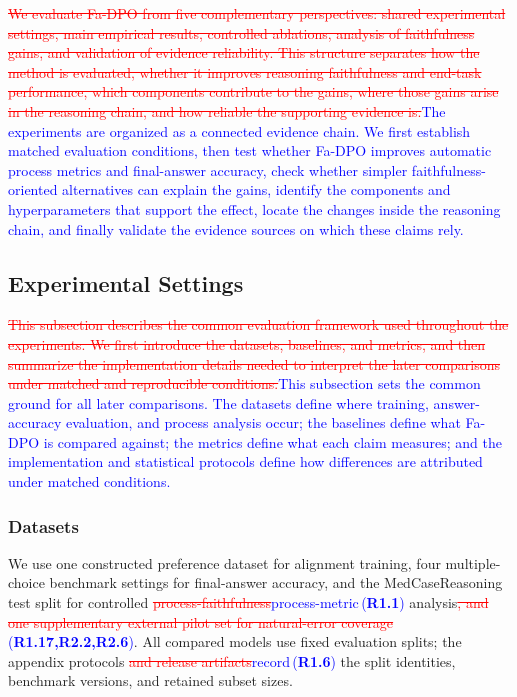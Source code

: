 \documentclass[a4paper,fleqn,doubleblind]{cas-sc}
\DeclareRobustCommand{\deleted}[1]{\textcolor{red}{\sout{#1}}}
\DeclareRobustCommand{\added}[1]{\textcolor{blue}{#1}}
\DeclareRobustCommand{\revtag}[1]{\textcolor{blue}{\scriptsize\,(\textbf{#1})}}
\begin{document}
\deleted{We evaluate Fa-DPO from five complementary perspectives: shared experimental settings, main empirical results, controlled ablations, analysis of faithfulness gains, and validation of evidence reliability. This structure separates how the method is evaluated, whether it improves reasoning faithfulness and end-task performance, which components contribute to the gains, where those gains arise in the reasoning chain, and how reliable the supporting evidence is.}\added{The experiments are organized as a connected evidence chain. We first establish matched evaluation conditions, then test whether Fa-DPO improves automatic process metrics and final-answer accuracy, check whether simpler faithfulness-oriented alternatives can explain the gains, identify the components and hyperparameters that support the effect, locate the changes inside the reasoning chain, and finally validate the evidence sources on which these claims rely.}

\subsection{Experimental Settings}
\label{subsec:settings}

\deleted{This subsection describes the common evaluation framework used throughout the experiments. We first introduce the datasets, baselines, and metrics, and then summarize the implementation details needed to interpret the later comparisons under matched and reproducible conditions.}\added{This subsection sets the common ground for all later comparisons. The datasets define where training, answer-accuracy evaluation, and process analysis occur; the baselines define what Fa-DPO is compared against; the metrics define what each claim measures; and the implementation and statistical protocols define how differences are attributed under matched conditions.}

\subsubsection{Datasets}
\label{subsubsec:datasets}
We use one constructed preference dataset for alignment training, four multiple-choice benchmark settings for final-answer accuracy, and the MedCaseReasoning~\cite{wu2025medcasereasoning} test split for controlled \deleted{process-faithfulness}\added{process-metric}\revtag{R1.1} analysis\deleted{, and one supplementary external pilot set for natural-error coverage}\revtag{R1.17,R2.2,R2.6}. All compared models use fixed evaluation splits; the appendix protocols \deleted{and release artifacts}\added{record}\revtag{R1.6} the split identities, benchmark versions, and retained subset sizes.
\end{document}
